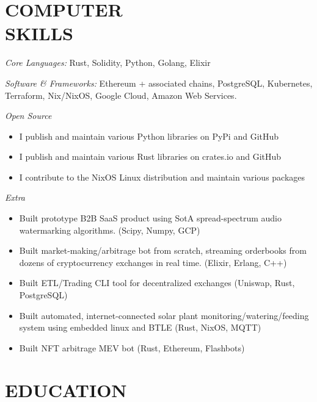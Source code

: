 \documentclass[margin, 10pt]{res}
\begin{document}
\begin{resume}

\section{COMPUTER \\ SKILLS}

{\sl Core Languages:}
Rust, Solidity, Python, Golang, Elixir

{\sl Software \& Frameworks:}
Ethereum + associated chains, PostgreSQL, Kubernetes, Terraform, Nix/NixOS, Google Cloud, Amazon Web Services.

{\sl Open Source}
\begin{itemize}
\item I publish and maintain various Python libraries on PyPi and GitHub
\item I publish and maintain various Rust libraries on crates.io and GitHub
\item I contribute to the NixOS Linux distribution and maintain various packages
\end{itemize}

{\sl Extra}
\begin{itemize}
\item Built prototype B2B SaaS product using SotA spread-spectrum audio watermarking algorithms. (Scipy, Numpy, GCP)
\item Built market-making/arbitrage bot from scratch, streaming orderbooks from dozens of cryptocurrency exchanges in real time. (Elixir, Erlang, C++)
\item Built ETL/Trading CLI tool for decentralized exchanges (Uniswap, Rust, PostgreSQL)
\item Built automated, internet-connected solar plant monitoring/watering/feeding system using embedded linux and BTLE (Rust, NixOS, MQTT)
\item Built NFT arbitrage MEV bot (Rust, Ethereum, Flashbots)
\end{itemize}


\section{EDUCATION}


\end{resume}
\end{document}
